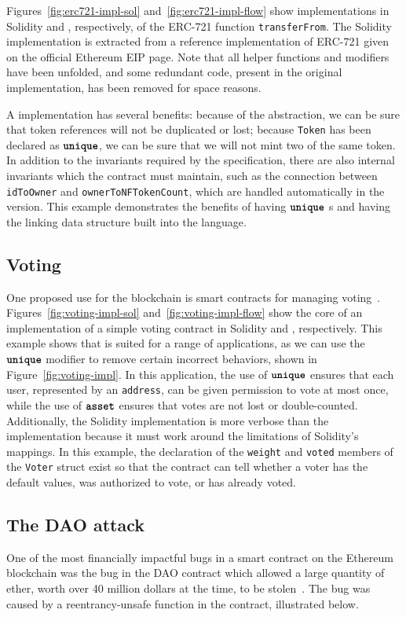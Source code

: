 \documentclass[dvipsnames, usenames, sigconf]{acmart}
\begin{document}
Figures~\ref{fig:erc721-impl-sol} and~\ref{fig:erc721-impl-flow} show implementations in Solidity and \langName, respectively, of the ERC-721 function \lstinline{transferFrom}.
The Solidity implementation is extracted from a reference implementation of ERC-721 given on the official Ethereum EIP page.
Note that all helper functions and modifiers have been unfolded, and some redundant code, present in the original implementation, has been removed for space reasons.

A \langName implementation has several benefits: because of the \assetTxt abstraction, we can be sure that token references will not be duplicated or lost; because \lstinline{Token} has been declared as $\textbf{\texttt{unique}}$, we can be sure that we will not mint two of the same token.
In addition to the invariants required by the specification, there are also internal invariants which the contract must maintain, such as the connection between \lstinline{idToOwner} and \lstinline{ownerToNFTokenCount}, which are handled automatically in the \langName version.
This example demonstrates the benefits of having $\textbf{\texttt{unique}}$ \assetTxt{}s and having the linking data structure built into the language.

\subsection{Voting}\label{sec:voting-impl}
One proposed use for the blockchain is smart contracts for managing voting~\cite{Elsden18:Making}.
Figures~\ref{fig:voting-impl-sol} and~\ref{fig:voting-impl-flow} show the core of an implementation of a simple voting contract in Solidity and \langName, respectively.
This example shows that \langName is suited for a range of applications, as we can use the $\textbf{\texttt{unique}}$ modifier to remove certain incorrect behaviors, shown in Figure~\ref{fig:voting-impl}.
In this application, the use of $\textbf{\texttt{unique}}$ ensures that each user, represented by an \lstinline{address}, can be given permission to vote at most once, while the use of $\textbf{\texttt{asset}}$ ensures that votes are not lost or double-counted.
Additionally, the Solidity implementation is more verbose than the \langName implementation because it must work around the limitations of Solidity's mappings.
In this example, the declaration of the \lstinline{weight} and \lstinline{voted} members of the \lstinline{Voter} struct exist so that the contract can tell whether a voter has the default values, was authorized to vote, or has already voted.

\subsection{The DAO attack}\label{sec:ex-dao-attack}
One of the most financially impactful bugs in a smart contract on the Ethereum blockchain was the bug in the DAO contract which allowed a large quantity of ether, worth over 40 million dollars at the time, to be stolen~\cite{OlivaEtAl2019}.
The bug was caused by a reentrancy-unsafe function in the contract, illustrated below.
\end{document}
